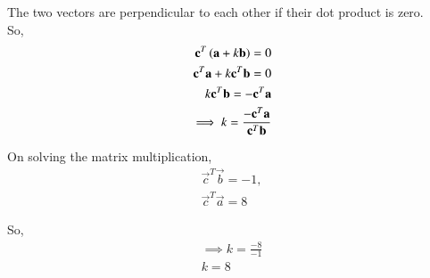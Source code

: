 
The two vectors are perpendicular to each other if their dot product is zero. \\
So, 
\begin{align}
\mathbf{c}^T\left(\mathbf{a}+ k\mathbf{b}\right)=0 \\
\mathbf{c}^T\mathbf{a}+ k\mathbf{c}^T\mathbf{b}=0 \\
k\mathbf{c}^T\mathbf{b} = -{\mathbf{c}^T\mathbf{a}} \\
\implies k= \frac{-\mathbf{c}^T\mathbf{a}}{\mathbf{c}^T\mathbf{b}}
\end{align}

On solving the matrix multiplication,
\begin{align}
\vec{c}^T\vec{b} = -1, \\ \vec{c}^T\vec{a} =  8  
\end{align}

So, 
\begin{align}
\implies k= \frac{-8}{-1}\\
k = 8
\end{align}

